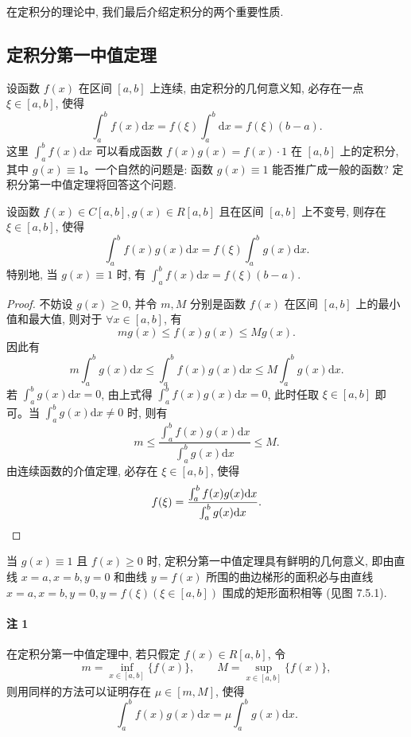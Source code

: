 在定积分的理论中, 我们最后介绍定积分的两个重要性质.

\subsection{定积分第一中值定理}
\label{subsec:ma-7-5-1}

设函数 $f(x)$ 在区间 $[a,b]$ 上连续, 由定积分的几何意义知, 必存在一点 $\xi\in[a,b]$, 使得
\[
  \int_a^b f(x)\mathrm dx=f(\xi)\int_a^b\mathrm dx=f(\xi)(b-a).
\]
这里 $\int_a^b f(x)\mathrm dx$ 可以看成函数 $f(x)g(x)=f(x)\cdot1$ 在 $[a,b]$ 上的定积分, 其中 $g(x)\equiv1$。一个自然的问题是: 函数 $g(x)\equiv1$ 能否推广成一般的函数? 定积分第一中值定理将回答这个问题.

\begin{theorem}[{定积分第一中值定理}]\label{theorem:ma-7-5-1}
设函数 $f(x)\in C[a,b],g(x)\in R[a,b]$ 且在区间 $[a,b]$ 上不变号, 则存在 $\xi\in[a,b]$, 使得
\[
  \int_a^b f(x)g(x)\mathrm dx=f(\xi)\int_a^b g(x)\mathrm dx.
\]
特别地, 当 $g(x)\equiv1$ 时, 有 $\int_a^b f(x)\mathrm dx=f(\xi)(b-a)$.
\end{theorem}


\begin{proof}
不妨设 $g(x)\geq0$, 并令 $m,M$ 分别是函数 $f(x)$ 在区间 $[a,b]$ 上的最小值和最大值, 则对于 $\forall x\in[a,b]$, 有
\[
  mg(x)\leq f(x)g(x)\leq Mg(x).
\]
因此有
\[
  m\int_a^b g(x)\mathrm dx
  \leq\int_a^b f(x)g(x)\mathrm dx
  \leq M\int_a^b g(x)\mathrm dx.
\]
若 $\int_a^b g(x)\mathrm dx=0$, 由上式得 $\int_a^b f(x)g(x)\mathrm dx=0$, 此时任取 $\xi\in[a,b]$ 即可。当 $\int_a^b g(x)\mathrm dx\neq0$ 时, 则有
\[
  m\leq
  \frac{\int_a^b f(x)g(x)\mathrm dx}{\int_a^b g(x)\mathrm dx}
  \leq M.
\]
由连续函数的介值定理, 必存在 $\xi\in[a,b]$, 使得
\[
  f(\xi)=
  \frac{\int_a^b f(x)g(x)\mathrm dx}{\int_a^b g(x)\mathrm dx}.
\qedhere
\]
\end{proof}


当 $g(x)\equiv1$ 且 $f(x)\geq0$ 时, 定积分第一中值定理具有鲜明的几何意义, 即由直线 $x=a,x=b,y=0$ 和曲线 $y=f(x)$ 所围的曲边梯形的面积必与由直线 $x=a,x=b,y=0,y=f(\xi)(\xi\in[a,b])$ 围成的矩形面积相等 (见图 7.5.1).

\paragraph*{注 1}
在定积分第一中值定理中, 若只假定 $f(x)\in R[a,b]$, 令
\[
  m=\inf_{x\in[a,b]}\{f(x)\},\qquad
  M=\sup_{x\in[a,b]}\{f(x)\},
\]
则用同样的方法可以证明存在 $\mu\in[m,M]$, 使得
\[
  \int_a^b f(x)g(x)\mathrm dx=\mu\int_a^b g(x)\mathrm dx.
\]

